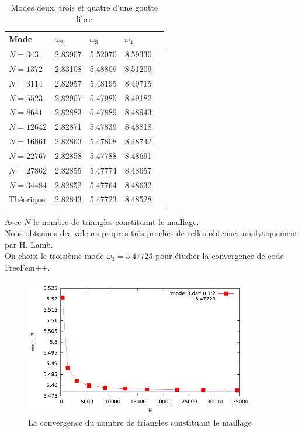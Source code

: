 \documentclass[a4paper]{report}
\begin{document}
\begin{table}[htp]
\begin{center}
    \begin{tabular}{ | l | l | l | l | l | }
    \hline
    Mode & $\omega_2$ & $\omega_3$ & $\omega_4$ \\
    \hline
    $N = 343$   & 2.83907 & 5.52070 & 8.59330 \\ %
    \hline
    $N = 1372$  & 2.83108 & 5.48809 & 8.51209 \\ %
    \hline
    $N = 3114$  & 2.82957 & 5.48195 & 8.49715 \\ %
    \hline
    $N = 5523$  & 2.82907 & 5.47985 & 8.49182 \\ %
    \hline
    $N = 8641$  & 2.82883 & 5.47889 & 8.48943 \\ %
    \hline
    $N = 12642$ & 2.82871 & 5.47839 & 8.48818 \\ %
    \hline
    $N = 16861$ & 2.82863 & 5.47808 & 8.48742 \\ %
    \hline
    $N = 22767$ & 2.82858 & 5.47788 & 8.48691 \\ %
    \hline
    $N = 27862$ & 2.82855 & 5.47774 & 8.48657 \\ %
    \hline
    $N = 34484$ & 2.82852 & 5.47764 & 8.48632 \\ %
    \hline
    Théorique   & 2.82843 & 5.47723 & 8.48528 \\
    \hline
    \end{tabular}
\end{center}
    \caption{Modes deux, trois et quatre d'une goutte libre}
\end{table}










Avec $N$ le nombre de triangles constituant le maillage.
\\[0.25cm]
Nous obtenons des valeurs propres très proches de celles obtenues analytiquement par H. Lamb.
\\[0.25cm]
On choisi le troisième mode $\omega_3 = 5.47723$ pour étudier la convergence de code FreeFem++.


\begin{figure}[h!] 
\begin{center}
\includegraphics[width=10cm]{2_3_1_mode_3}
\caption{La convergence du nombre de triangles constituant le maillage}
\end{center}
\end{figure}
\end{document}
